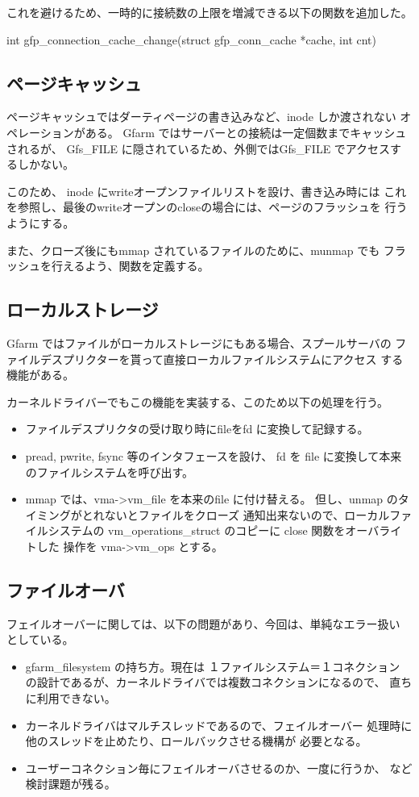 	これを避けるため、一時的に接続数の上限を増減できる以下の関数を追加した。

	int gfp_connection_cache_change(struct gfp_conn_cache *cache, int cnt)

\subsection{ページキャッシュ}
	ページキャッシュではダーティページの書き込みなど、inode しか渡されない
	オペレーションがある。
	Gfarm ではサーバーとの接続は一定個数までキャッシュされるが、
	Gfs_FILE に隠されているため、外側ではGfs_FILE でアクセスするしかない。

	このため、 inode にwriteオープンファイルリストを設け、書き込み時には
	これを参照し、最後のwriteオープンのcloseの場合には、ページのフラッシュを
	行うようにする。

	また、クローズ後にもmmap されているファイルのために、munmap でも
	フラッシュを行えるよう、関数を定義する。

\subsection{ローカルストレージ}
	Gfarm ではファイルがローカルストレージにもある場合、スプールサーバの
	ファイルデスプリクターを貰って直接ローカルファイルシステムにアクセス
	する機能がある。

	カーネルドライバーでもこの機能を実装する、このため以下の処理を行う。
	\begin{itemize}
	\item	ファイルデスプリクタの受け取り時にfileをfd に変換して記録する。
	\item	pread, pwrite, fsync 等のインタフェースを設け、
		fd を file に変換して本来のファイルシステムを呼び出す。
	\item	mmap では、vma->vm_file を本来のfile に付け替える。
		但し、unmap のタイミングがとれないとファイルをクローズ
		通知出来ないので、ローカルファイルシステムの
		vm_operations_struct のコピーに close 関数をオーバライトした
		操作を vma->vm_ops とする。
	\end{itemize}

\subsection{ファイルオーバ}
	フェイルオーバーに関しては、以下の問題があり、今回は、単純なエラー扱い
	としている。
	\begin{itemize}
	\item	gfarm_filesystem の持ち方。現在は
		１ファイルシステム＝１コネクション
		の設計であるが、カーネルドライバでは複数コネクションになるので、
		直ちに利用できない。
	\item	カーネルドライバはマルチスレッドであるので、フェイルオーバー
		処理時に他のスレッドを止めたり、ロールバックさせる機構が
		必要となる。
	\item	ユーザーコネクション毎にフェイルオーバさせるのか、一度に行うか、
		など検討課題が残る。
	\end{itemize}


